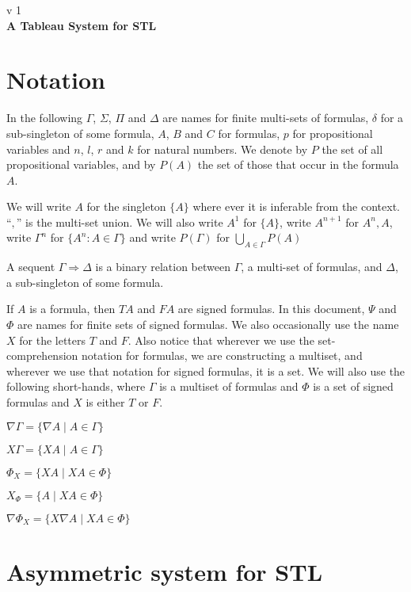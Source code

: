 \documentclass[a4paper, 12pt]{paper}
\begin{document}
{\noindent
	v 1 \\
{\large\textbf{A Tableau System for STL}}
}
\\
\setcounter{section}{-1}
\section{Notation} In the following $\Gamma$, $\Sigma$, $\Pi$ and $\Delta$ are names for finite multi-sets of formulas, $\delta$ for a sub-singleton of some formula, $A$, $B$ and $C$ for formulas, $p$ for propositional variables and $n$, $l$, $r$ and $k$ for natural numbers. We denote by $P$ the set of all propositional variables, and by $P(A)$ the set of those that occur in the formula $A$.

We will write $A$ for the singleton $\{A\}$ where ever it is inferable from the context.
``$,$'' is the multi-set union.
We will also write $A^1$ for $\{A\}$, write $A^{n+1}$ for $A^n, A$, write $\Gamma^n$ for $\{ A^n : A \in \Gamma \}$ and write $P(\Gamma)$ for $\bigcup_{A \in \Gamma} P(A)$

A sequent $\Gamma \Rightarrow \Delta$ is a binary relation between $\Gamma$, a multi-set of formulas, and $\Delta$, a sub-singleton of some formula.

If $A$ is a formula, then $T A$ and $F A$ are signed formulas. In this document, $\Psi$ and $\Phi$ are names for finite sets of signed formulas. We also occasionally use the name $X$ for the letters $T$ and $F$. Also notice that wherever we use the set-comprehension notation for formulas, we are constructing a multiset, and wherever we use that notation for signed formulas, it is a set. We will also use the following short-hands, where $\Gamma$ is a multiset of formulas and $\Phi$ is a set of signed formulas and $X$ is either $T$ or $F$.

$\nabla \Gamma = \{ \nabla A \mid A \in \Gamma \}$

$X \Gamma = \{ X A \mid A \in \Gamma \}$

$\Phi_X = \{ X A \mid X A \in \Phi \}$

$X_\Phi = \{ A \mid X A \in \Phi \}$

$\nabla \Phi_X = \{ X \nabla A \mid X A \in \Phi \}$



\section{Asymmetric system for STL} \quad \\
\end{document}
